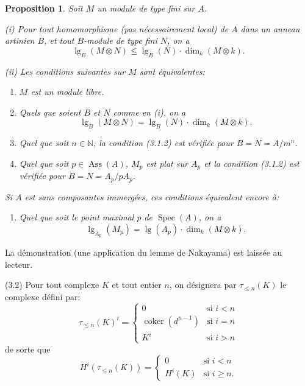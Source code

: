 \documentclass[12pt]{amsart}
\theoremstyle{plain}
\newtheorem{prop}{Proposition}[section]
\theoremstyle{remark}
\DeclareMathOperator{\coker}{coker}
\DeclareMathOperator{\Spec}{Spec}
\DeclareMathOperator{\lgB}{lg}
\DeclareMathOperator{\Ass}{Ass}
\begin{document}
\begin{prop}\label{prop:3.1}
Soit $M$ un module de type fini sur $A$.

\textup{(i)} Pour tout homomorphisme (pas n\'ecessairement local) de $A$ dans un anneau artinien $B$, et tout $B$-module de type fini $N$, on a
\begin{equation}\label{eq:3.1.1}
\lgB_B(M \otimes N) \leq \lgB_B(N) \cdot \dim_k(M \otimes k).
\end{equation}

\textup{(ii)} Les conditions suivantes sur $M$ sont \'equivalentes:
\begin{enumerate}
\item[(a)] $M$ est un module libre.
\item[(b)] Quels que soient $B$ et $N$ comme en (i), on a
\begin{equation}\label{eq:3.1.2}
\lgB_B(M \otimes N) = \lgB_B(N) \cdot \dim_k(M \otimes k).
\end{equation}
\item[(c)] Quel que soit $n \in \mathbb{N}$, la condition (3.1.2) est v\'erifi\'ee pour $B = N = A/m^n$.
\item[(d)] Quel que soit $p \in \Ass(A)$, $M_p$ est plat sur $A_p$ et la condition (3.1.2) est v\'erifi\'ee pour $B = N = A_p/pA_p$.
\end{enumerate}
Si $A$ est sans composantes immerg\'ees, ces conditions \'equivalent encore \`a:
\begin{enumerate}
\item[(e)] Quel que soit le point maximal $p$ de $\Spec(A)$, on a
\begin{equation}\label{eq:3.1.2'}
\lgB_{A_p}(M_p) = \lgB(A_p) \cdot \dim_k(M \otimes k).
\end{equation}
\end{enumerate}
\end{prop}

La d\'emonstration (une application du lemme de Nakayama) est laiss\'ee au lecteur.

(3.2) Pour tout complexe $K$ et tout entier $n$, on d\'esignera par $\tau_{\leq n}(K)$ le complexe d\'efini par:
\begin{equation}\label{eq:3.2.1}
\tau_{\leq n}(K)^i = \begin{cases}
0 & \text{si } i < n \\
\coker(d^{n-1}) & \text{si } i = n \\
K^i & \text{si } i > n
\end{cases}
\end{equation}
de sorte que
\begin{equation}\label{eq:3.2.2}
H^i(\tau_{\leq n}(K)) = \begin{cases}
0 & \text{si } i < n \\
H^i(K) & \text{si } i \geq n.
\end{cases}
\end{equation}
\end{document}
